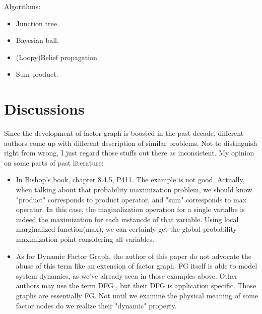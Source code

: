 \documentclass[11pt,a4paper]{article}
\begin{document}
Algorithms:
\begin{itemize}
	\item Junction tree. 
	\item Bayesian ball. 
	\item (Loopy)Belief propagation. 
	\item Sum-product. 
\end{itemize}

\section{Discussions}

Since the development of factor graph is boosted in the past decade, 
different authors come up with different description of similar problems. 
Not to distinguish right from wrong, I just regard those stuffs out there
as inconsistent. My opinion on some parts of past literature:
\begin{itemize}
	\item In Bishop's book\cite{bishop2006pattern}, chapter 8.4.5, P411. 
	The example is not good. Actually, when talking about that probability 
	maximization problem, we should know "product" corresponds to product operator, 
	and "sum" corresponds to max operator. In this case, the maginalization 
	operation for a single varialbe is indeed the maximization for each 
	instancde of that variable. Using local marginalized function(max), we 
	can certainly get the global probability maximization point considering
	all variables. 
	\item As for Dynamic Factor Graph, the author of this paper do not advocate 
	the abuse of this term like an extension of factor graph. FG itself is able 
	to model system dynamics, as we've already seen in those examples above. 
	Other authors may use the term DFG
\cite{wang2011-dynamic}
\cite{mirowski2009dynamic}
	, but their DFG is application specific. 
	Those graphs are essentially FG. Not until we examine the physical meaning of 
	some factor nodes do we realize their "dynamic" property. 
\end{itemize}



\end{document}
